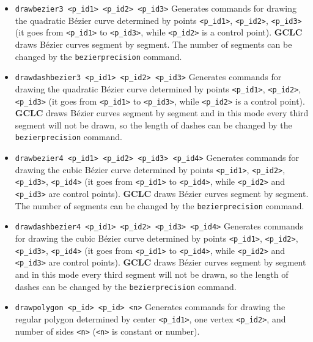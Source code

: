 \documentclass[a4paper]{book}
\newcommand{\gclc}{{\bfseries GCLC}\xspace}
\begin{document}
\begin{itemize}
\item \verb|drawbezier3 <p_id1> <p_id2> <p_id3>|
        Generates com\-mands for drawing the quadratic B\'ezier
        curve determined by points \verb|<p_id1>|, \verb|<p_id2>|,
        \verb|<p_id3>| (it goes from \verb|<p_id1>| to \verb|<p_id3>|,
        while \verb|<p_id2>| is a control point).
        \gclc draws B\'ezier curves segment by segment. The number of
        segments can be changed by the \verb|bezierprecision| command.

\item \verb|drawdashbezier3 <p_id1> <p_id2> <p_id3>|
        Generates com\-mands for drawing the quadratic B\'ezier
        curve determined by points \verb|<p_id1>|, \verb|<p_id2>|,
        \verb|<p_id3>| (it goes from \verb|<p_id1>| to \verb|<p_id3>|,
        while \verb|<p_id2>| is a control point).
        \gclc draws B\'ezier curves segment by segment and in this
        mode every third segment will not be drawn, so the length
        of dashes can be changed by the \verb|bezierprecision| command.

\item \verb|drawbezier4 <p_id1> <p_id2> <p_id3> <p_id4>|
        Generates com\-mands for drawing the cubic B\'ezier
        curve determined by points \verb|<p_id1>|, \verb|<p_id2>|,
        \verb|<p_id3>|, \verb|<p_id4>| (it goes from \verb|<p_id1>|
        to \verb|<p_id4>|,  while \verb|<p_id2>| and \verb|<p_id3>|
        are control points).
        \gclc draws B\'ezier curves segment by segment. The number of
        segments can be changed by the \verb|bezierprecision| command.

\item \verb|drawdashbezier4 <p_id1> <p_id2> <p_id3> <p_id4>|
        Generates com\-mands for drawing the cubic B\'ezier
        curve determined by points \verb|<p_id1>|, \verb|<p_id2>|,
        \verb|<p_id3>|, \verb|<p_id4>| (it goes from \verb|<p_id1>|
        to \verb|<p_id4>|,  while \verb|<p_id2>| and \verb|<p_id3>|
        are control points).
        \gclc draws B\'ezier curves segment by segment and in this
        mode every third segment will not be drawn, so the length
        of dashes can be changed by the \verb|bezierprecision| command.

\item \verb|drawpolygon <p_id> <p_id> <n>|
        Generates commands for drawing the regular polygon
        determined by center \verb|<p_id1>|, one vertex
        \verb|<p_id2>|, and number of sides \verb|<n>|
        (\verb|<n>| is constant or {\sc number}).


\end{itemize}
\end{document}
